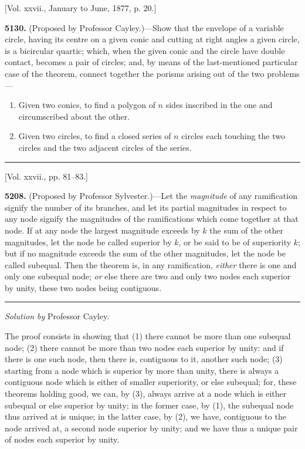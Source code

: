 \documentclass[10pt,twoside]{article}
\begin{document}
\newpage

\begin{center}
[Vol. xxvii., January to June, 1877, p. 20.]
\end{center}

\noindent\textbf{5130.} (Proposed by Professor Cayley.)---Show that the
envelope of a variable circle, having its centre on a given conic and cutting at
right angles a given circle, is a bicircular quartic; which, when the given
conic and the circle have double contact, becomes a pair of circles; and, by
means of the last-mentioned particular case of the theorem, connect together the
porisms arising out of the two problems---

\begin{enumerate}
\item[(i)] Given two conics, to find a polygon of \(n\) sides inscribed in the
one and circumscribed about the other.
\item[(ii)] Given two circles, to find a closed series of \(n\) circles each
touching the two circles and the two adjacent circles of the series.
\end{enumerate}

\begin{center}
\rule{0.32\linewidth}{0.4pt}

[Vol. xxvii., pp. 81--83.]
\end{center}

\noindent\textbf{5208.} (Proposed by Professor Sylvester.)---Let the
\textit{magnitude} of any ramification signify the number of its branches, and
let its partial magnitudes in respect to any node signify the magnitudes of the
ramifications which come together at that node. If at any node the largest
magnitude exceeds by \(k\) the sum of the other magnitudes, let the node be
called superior by \(k\), or be said to be of superiority \(k\); but if no
magnitude exceeds the sum of the other magnitudes, let the node be called
subequal. Then the theorem is, in any ramification, \textit{either} there is one
and only one subequal node; \textit{or} else there are two and only two nodes
each superior by unity, these two nodes being contiguous.

\begin{center}
\rule{0.25\linewidth}{0.4pt}

\textit{Solution by} Professor Cayley.
\end{center}

The proof consists in showing that (1) there cannot be more than one subequal
node; (2) there cannot be more than two nodes each superior by unity: and if
there is one such node, then there is, contiguous to it, another such node; (3)
starting from a node which is superior by more than unity, there is always a
contiguous node which is either of smaller superiority, or else subequal; for,
these theorems holding good, we can, by (3), always arrive at a node which is
either subequal or else superior by unity; in the former case, by (1), the
subequal node thus arrived at is unique; in the latter case, by (2), we have,
contiguous to the node arrived at, a second node superior by unity; and we have
thus a unique pair of nodes each superior by unity.
\end{document}
